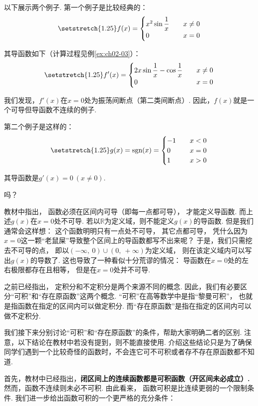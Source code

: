 以下展示两个例子.
第一个例子是比较经典的：\vspace{0.25em}
\[
\setstretch{1.25}
f(x) =
\begin{cases}
x^{2}\sin{\displaystyle\frac{1}{x}} &\quad x \ne 0 \\
0 &\quad x = 0
\end{cases}
\] 

其导函数如下（计算过程见例\ref{ex:ch02-03}）：\vspace{0.25em}
\[
\setstretch{1.25}
f'(x) =
\begin{cases}
2x\sin{\displaystyle\frac{1}{x}}-\cos{\displaystyle\frac{1}{x}} &\quad x \ne 0 \\
0 &\quad x = 0
\end{cases}
\] 

我们发现，$f'(x)$在$x=0$处为振荡间断点（第二类间断点）.
因此，$f(x)$就是一个可导但导函数不连续的例子.\vspace{0.5em}

第二个例子是这样的：
\[
\setstretch{1.25}
g(x) = \text{sgn}(x) =
\begin{cases}
-1 &\quad x < 0 \\
0 &\quad x = 0 \\
1 &\quad x > 0
\end{cases}
\] 
\par
其导函数是$g'(x)=0~(x \ne 0)$.\par
吗？\par
教材中指出，
函数必须在区间内可导（即每一点都可导），
才能定义导函数.
而上述$g(x)$在$x=0$处不可导. 若以$\mathbb{R}$为定义域，则不能定义$g(x)$的导函数.
但是我们通常会这样想：
这个函数明明只有一点处不可导，
其它点都可导，
凭什么因为$x=0$这一颗“老鼠屎”导致整个区间上的导函数都写不出来呢？
于是，我们只需挖去不可导的点，
即以$(-\infty,~0)\cup(0,~+\infty)$为定义域，
则在该定义域内可以写出$g(x)$的导数了.
这也导致了一种看似十分荒谬的情况：
导函数在$x=0$处的左右极限都存在且相等，
但是在$x=0$处并不可导. \vspace{1em}

之前已经指出，
定积分和不定积分是两个来源不同的概念.
因此，我们有必要区分“可积”和“存在原函数”这两个概念.
“可积”在高等数学中是指“黎曼可积”，
也就是指函数在指定的区间内可以做定积分.
而“存在原函数”是指在指定的区间内可以做不定积分.

我们接下来分别讨论“可积”和“存在原函数”的条件，帮助大家明确二者的区别. 注意，以下结论在教材中若没有提到，则不能直接使用.
介绍这些结论只是为了确保同学们遇到一个比较奇怪的函数时，不会连它可不可积或者存不存在原函数都不知道.\par
首先，教材中已经指出，\textbf{闭区间上的连续函数都是可积函数（开区间未必成立）. }
然而，函数不连续则未必不可积.
由此看来，
函数可积是比连续更弱的一个限制条件. 我们进一步给出函数可积的一个更严格的充分条件：\vspace{0.5em}

